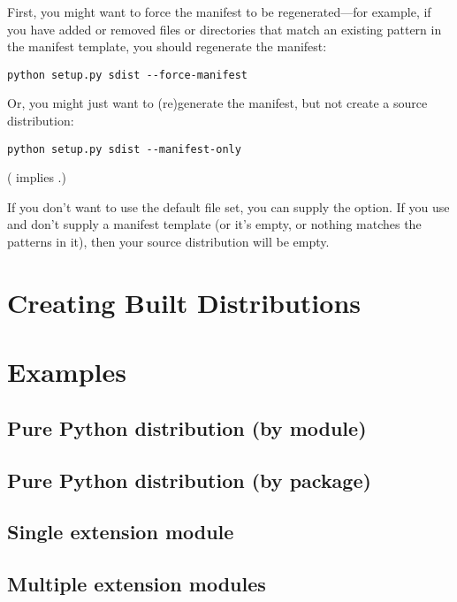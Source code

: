 \documentclass{howto}
\begin{document}
First, you might want to force the manifest to be regenerated---for
example, if you have added or removed files or directories that match an
existing pattern in the manifest template, you should regenerate the
manifest:
\begin{verbatim}
python setup.py sdist --force-manifest
\end{verbatim}

Or, you might just want to (re)generate the manifest, but not create a
source distribution:
\begin{verbatim}
python setup.py sdist --manifest-only
\end{verbatim}
( implies .)

If you don't want to use the default file set, you can supply the
 option.  If you use  and
don't supply a manifest template (or it's empty, or nothing matches the
patterns in it), then your source distribution will be empty.


\section{Creating Built Distributions}
\label{sec:built-dist}



\section{Examples}
\label{sec:examples}


\subsection{Pure Python distribution (by module)}
\label{sec:pure-mod}


\subsection{Pure Python distribution (by package)}
\label{sec:pure-pkg}


\subsection{Single extension module}
\label{sec:single-ext}


\subsection{Multiple extension modules}
\label{sec:multiple-ext}
\end{document}
